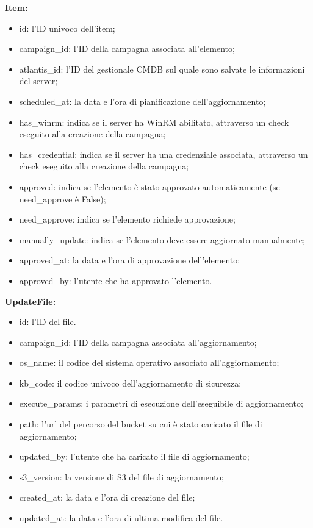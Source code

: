 \noindent \textbf{Item:}
\begin{itemize}
\item id: l'ID univoco dell’item;
\item campaign\_id: l’ID della campagna associata all'elemento;
\item atlantis\_id: l'ID del gestionale CMDB sul quale sono salvate le informazioni del server;
\item scheduled\_at: la data e l'ora di pianificazione dell'aggiornamento;
\item has\_winrm: indica se il server ha WinRM abilitato, attraverso un check eseguito alla creazione della campagna;
\item has\_credential: indica se il server ha una credenziale associata, attraverso un check eseguito alla creazione della campagna;
\item approved: indica se l'elemento è stato approvato automaticamente (se need\_approve è False);
\item need\_approve: indica se l'elemento richiede approvazione;
\item manually\_update: indica se l'elemento deve essere aggiornato manualmente;
\item approved\_at: la data e l'ora di approvazione dell'elemento;
\item approved\_by: l'utente che ha approvato l'elemento.
\end{itemize}

\noindent \textbf{UpdateFile:}
\begin{itemize}
\item id: l'ID del file.
\item campaign\_id: l'ID della campagna associata all'aggiornamento;
\item os\_name: il codice del sistema operativo associato all'aggiornamento;
\item kb\_code: il codice univoco dell'aggiornamento di sicurezza;
\item execute\_params: i parametri di esecuzione dell'eseguibile di aggiornamento;
\item path: l'url del percorso del bucket su cui è stato caricato il file di aggiornamento;
\item updated\_by: l'utente che ha caricato il file di aggiornamento;
\item s3\_version: la versione di S3 del file di aggiornamento;
\item created\_at: la data e l'ora di creazione del file;
\item updated\_at: la data e l'ora di ultima modifica del file.
\end{itemize}

